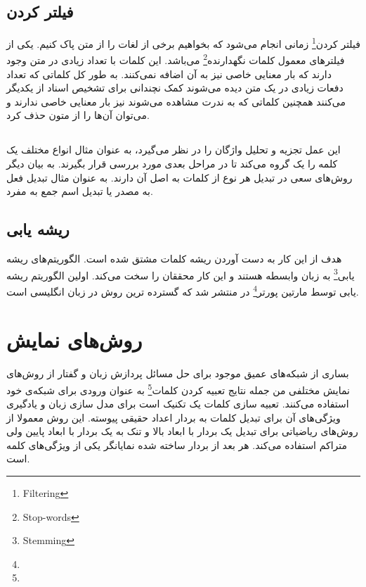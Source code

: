 \documentclass[12pt, a4paper, oneside]{report}
\begin{document}
\subsection{فیلتر کردن}

فیلتر کردن\footnote{Filtering}
زمانی انجام می‌شود که بخواهیم برخی از لغات را از متن پاک کنیم. یکی از فیلتر‌های معمول
کلمات نگهدارنده\footnote{Stop-words}
می‌باشد. این کلمات با تعداد زیادی در متن وجود دارند که بار معنایی خاصی نیز به آن اضافه نمی‌کنند.
به طور کل کلماتی که تعداد دفعات زیادی در یک متن دیده می‌شوند کمک نچندانی برای تشخیص اسناد از یکدیگر می‌کنند
همچنین کلماتی که به ندرت مشاهده می‌شوند نیز بار معنایی خاصی ندارند و می‌توان آن‌ها را از متون حذف کرد\cite{DBLP:journals/corr/AllahyariPASTGK17a}.

\subsection{}

این عمل تجزیه و تحلیل واژگان را در نظر می‌گیرد، به عنوان مثال انواع مختلف یک کلمه را یک گروه می‌کند تا در مراحل بعدی
مورد بررسی قرار بگیرند. به بیان دیگر روش‌های
سعی در تبدیل هر نوع از کلمات به اصل آن دارند. به عنوان مثال تبدیل فعل به مصدر یا تبدیل اسم جمع به مفرد\cite{DBLP:journals/corr/AllahyariPASTGK17a}.

\subsection{ریشه یابی}

هدف از این کار به دست آوردن ریشه کلمات مشتق شده است. الگوریتم‌های
ریشه یابی\footnote{Stemming}
به زبان وابسطه هستند و این کار محققان را سخت می‌کند. اولین الگوریتم
ریشه یابی
توسط
مارتین پورتر\footnote{}
در
\cite{porter1980algorithm}
منتشر شد که گسترده ترین روش در زبان انگلیسی است\cite{DBLP:journals/corr/AllahyariPASTGK17a}.


\section{روش‌های نمایش}

بساری از شبکه‌های عمیق موجود برای حل مسائل پردازش زبان و گفتار از روش‌های نمایش مختلفی من جمله نتایج
تعبیه کردن کلمات\footnote{}
به عنوان ورودی برای شبکه‌ی خود استفاده می‌کنند.
تعبیه سازی کلمات
یک تکنیک است برای مدل سازی زبان و یادگیری ویژگی‌های آن برای تبدیل کلمات به بردار اعداد حقیقی پیوسته.
این روش معمولا از روش‌های ریاضیاتی برای تبدیل یک بردار با ابعاد بالا و تنک به یک بردار با ابعاد پایین ولی متراکم استفاده می‌کند.
هر بعد از بردار ساخته شده نمایانگر یکی از ویژگی‌های کلمه است.
\end{document}
